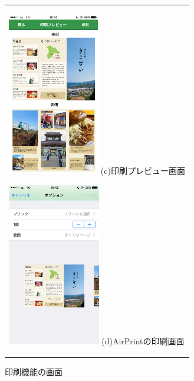 \begin{figure}[htbp]
\begin{center}
\begin{tabular}{c}
      \begin{minipage}{0.33\hsize}
        \begin{center}
\includegraphics[width=4cm, bb=0 0 304 570]{kiko_print4.PNG}
          \hspace{1cm} (c)印刷プレビュー画面
        \end{center}
      \end{minipage}

      \begin{minipage}{0.33\hsize}
        \begin{center}
\includegraphics[width=4cm, bb=0 0 304 570]{kiko_print5.PNG}
          \hspace{1cm} (d)AirPrintの印刷画面
        \end{center}
      \end{minipage}
      

    \end{tabular}
    \caption{印刷機能の画面}
    \label{fig:lena}
  \end{center}
\end{figure}　　　　　　　

